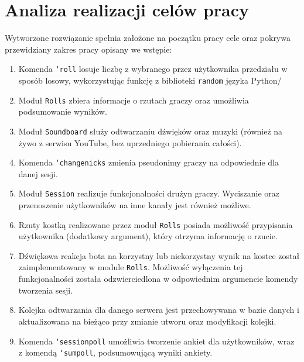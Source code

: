 \documentclass[shortabstract,inz]{iithesis}
\begin{document}
		\section{Analiza realizacji celów pracy}
		Wytworzone rozwiązanie spełnia założone na początku pracy cele oraz pokrywa przewidziany zakres pracy opisany we wstępie:
		\begin{enumerate}
			\item Komenda \texttt{`roll} losuje liczbę z wybranego przez użytkownika przedziału w sposób losowy, wykorzystując funkcję z biblioteki \texttt{random} języka Python/
			\item Moduł \texttt{Rolls} zbiera informacje o rzutach graczy oraz umożliwia podsumowanie wyników.
			\item Moduł \texttt{Soundboard} służy odtwarzaniu dźwięków oraz muzyki (również na żywo z serwisu YouTube, bez uprzedniego pobierania całości).
			\item Komenda \texttt{`changenicks} zmienia pseudonimy graczy na odpowiednie dla danej sesji.
			\item Moduł \texttt{Session} realizuje funkcjonalności drużyn graczy. Wyciszanie oraz przenoszenie użytkowników na inne kanały jest również możliwe.
			\item Rzuty kostką realizowane przez moduł \texttt{Rolls} posiada możliwość przypisania użytkownika (dodatkowy argument), który otrzyma informację o rzucie.
			\item Dźwiękowa reakcja bota na korzystny lub niekorzystny wynik na kostce został zaimplementowany w module \texttt{Rolls}. Możliwość wyłączenia tej funkcjonalności została odzwierciedlona w odpowiednim argumencie komendy tworzenia sesji.
			\item Kolejka odtwarzania dla danego serwera jest przechowywana w bazie danych i aktualizowana na bieżąco przy zmianie utworu oraz modyfikacji kolejki.
			\item Komenda \texttt{`sessionpoll} umożliwia tworzenie ankiet dla użytkowników, wraz z komendą \texttt{`sumpoll}, podsumowującą wyniki ankiety.
		\end{enumerate}
	
\end{document}
